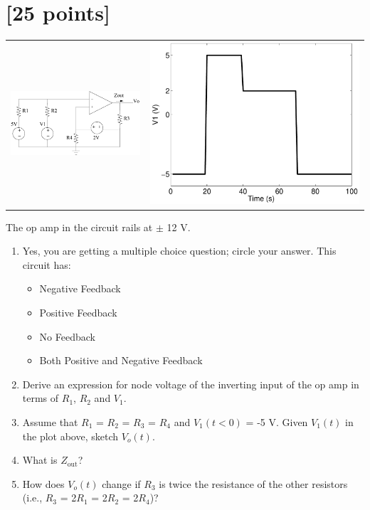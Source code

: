 

\section{[25 points]}

\begin{tabular}{cc}
\centering
\includegraphics[width=0.6\linewidth]{comparator} &
\includegraphics[width=0.4\linewidth]{comparator_v1} \\
\end{tabular}

The op amp in the circuit rails at $\pm$ 12 V.

\begin{enumerate}
    \item Yes, you are getting a multiple choice question; circle your answer.  This circuit has:
    \begin{itemize}
        \item Negative Feedback
        \item Positive Feedback
        \item No Feedback
        \item Both Positive and Negative Feedback
    \end{itemize}
    \item Derive an expression for node voltage of the inverting input of the op amp in terms of $R_1$, $R_2$ and $V_1$.
    \item Assume that $R_1$ = $R_2$ = $R_3$ = $R_4$ and $V_1(t < 0)$ = -5 V.  Given $V_1(t)$ in the plot above, sketch $V_o(t)$.
    \item What is $Z_\textrm{out}$?
    \item How does $V_o(t)$ change if $R_3$ is twice the resistance of the other resistors (i.e., $R_3$ = 2$R_1$ = 2$R_2$ = 2$R_4$)?
\end{enumerate}

\clearpage



\clearpage
